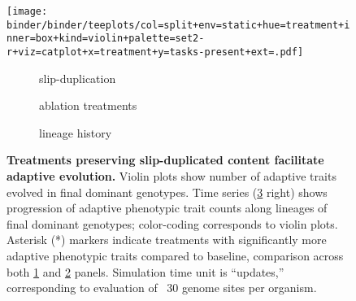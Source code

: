 \begin{figure}[!h]
  \centering
  \begin{adjustbox}{scale=0.8}
    \texttt{[image: binder/binder/teeplots/col=split+env=static+hue=treatment+inner=box+kind=violin+palette=set2-r+viz=catplot+x=treatment+y=tasks-present+ext=.pdf]}%
    \hspace*{-2.0cm}%
    \raisebox{0.125in}{%
      \texttt{[image: binder/binder/teeplots/env=static+errorbar=ci+hue=treatment+kind=line+palette=set2-r+viz=relplot+x=time-100k+y=tasks-present+ext=.pdf]}}%
  \end{adjustbox}

  \vspace{-7ex}

  \begin{subfigure}{0.3\textwidth}
    \caption{\small slip-duplication}
    \label{fig:results_panels:slip_duplication}
  \end{subfigure}%
  \begin{subfigure}{0.35\textwidth}
    \caption{\small ablation treatments}
    \label{fig:results_panels:ablation}
  \end{subfigure}%
  \begin{subfigure}{0.22\textwidth}
    \caption{\small lineage history}
    \label{fig:results_panels:time_series}
  \end{subfigure}

  \vspace{1ex}

  \caption{\textbf{Treatments preserving slip-duplicated content facilitate adaptive evolution.}
    \small Violin plots show number of adaptive traits evolved in final dominant genotypes.
    Time series (\ref{fig:results_panels:time_series} right) shows progression of adaptive phenotypic trait counts along lineages of final dominant genotypes; color-coding corresponds to violin plots.
    Asterisk (*) markers indicate treatments with significantly more adaptive phenotypic traits compared to baseline, comparison across both \ref{fig:results_panels:slip_duplication} and \ref{fig:results_panels:ablation} panels.
    Simulation time unit is “updates,” corresponding to evaluation of ~30 genome sites per organism.}
  \label{fig:results_panels}
\end{figure}
